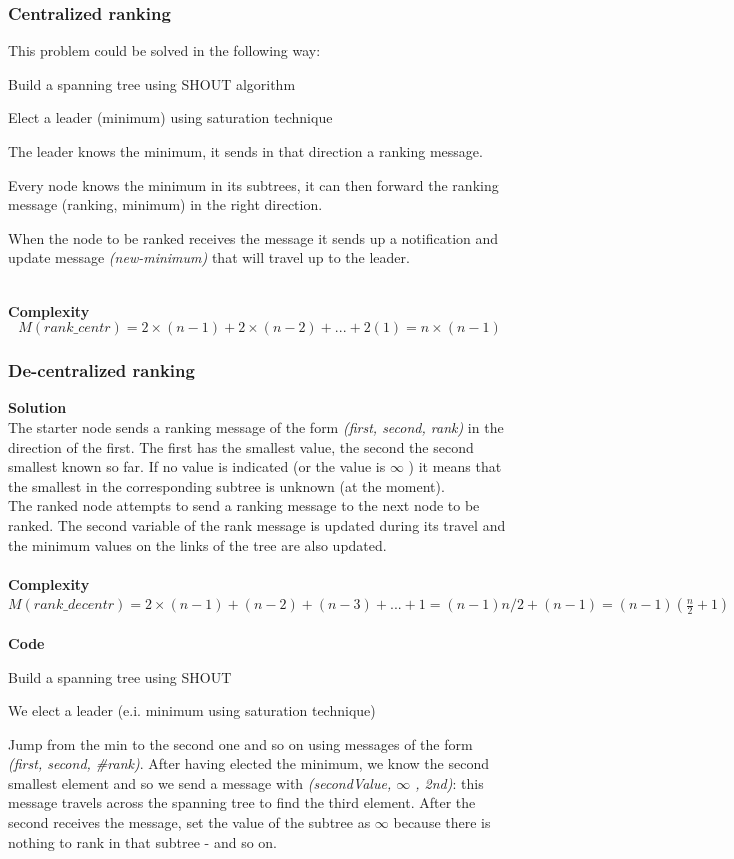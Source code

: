 \documentclass[paper=a4, fontsize=11pt]{scrartcl} %
\numberwithin{equation}{section} %
\numberwithin{figure}{section} %
\numberwithin{table}{section} %
\begin{document}
\subsubsection*{Centralized ranking}
This problem could be solved in the following way:
\begin{compactitem}
\item Build a spanning tree using SHOUT algorithm
\item Elect a leader (minimum) using saturation technique
\item The leader knows the minimum, it sends in that direction a ranking message.
\item Every node knows the minimum in its subtrees, it can then forward the ranking message (ranking, minimum) in the right direction.
\item When the node to be ranked receives the message it sends up a notification and update message \textit{(new-minimum)} that will travel up to the leader.
\end{compactitem}
~ \\
\textbf{Complexity}
$$M(rank\_centr) = 2\times(n-1)+ 2\times(n-2)+ ... + 2(1)= n\times(n-1)$$ 
\clearpage
\subsubsection*{De-centralized ranking}
\textbf{Solution}\\
The starter node sends a ranking message of the form \textit{(first, second, rank)} in the direction of the first. The first has the smallest value, the second the second smallest known so far. If no value is indicated (or the value is $\infty$ ) it means that the smallest in the corresponding subtree is unknown (at the moment).\\
The ranked node attempts to send a ranking message to the next node to be ranked. The second variable of the rank message is updated during its travel and the minimum values on the links of the tree are also updated.\\ ~ \\
\textbf{Complexity} \\ $M(rank\_decentr) = 2\times(n-1)+ (n-2)+ (n-3)+ ...+ 1= (n-1)n/2+ (n-1)= (n-1)(\frac{n}{2}+1)$ \\ ~ \\
\textbf{Code}
\begin{compactitem}
\item Build a spanning tree using SHOUT
\item We elect a leader (e.i. minimum using saturation technique)
\item Jump from the min to the second one and so on using messages of the form\\ \textit{(first, second, \#rank)}. After having elected the minimum, we know the second smallest element and so we send a message with \textit{(secondValue, $\infty$ , 2nd)}: this message travels across the spanning tree to find the third element. After the second receives the message, set the value of the subtree as $\infty$ because there is nothing to rank in that subtree - and so on. 
\end{compactitem}
~ 
\end{document}
